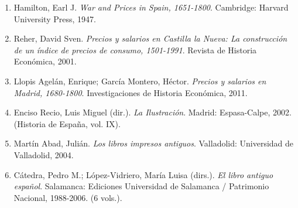 \documentclass[12pt,a4paper]{article}
\begin{document}
\begin{enumerate}
    \item Hamilton, Earl J. \textit{War and Prices in Spain, 1651-1800}. Cambridge: Harvard University Press, 1947.

    \item Reher, David Sven. \textit{Precios y salarios en Castilla la Nueva: La construcción de un índice de precios de consumo, 1501-1991}. Revista de Historia Económica, 2001.

    \item Llopis Agelán, Enrique; García Montero, Héctor. \textit{Precios y salarios en Madrid, 1680-1800}. Investigaciones de Historia Económica, 2011.

    \item Enciso Recio, Luis Miguel (dir.). \textit{La Ilustración}. Madrid: Espasa-Calpe, 2002. (Historia de España, vol. IX).

    \item Martín Abad, Julián. \textit{Los libros impresos antiguos}. Valladolid: Universidad de Valladolid, 2004.

    \item Cátedra, Pedro M.; López-Vidriero, María Luisa (dirs.). \textit{El libro antiguo español}. Salamanca: Ediciones Universidad de Salamanca / Patrimonio Nacional, 1988-2006. (6 vols.).
\end{enumerate}
\end{document}

